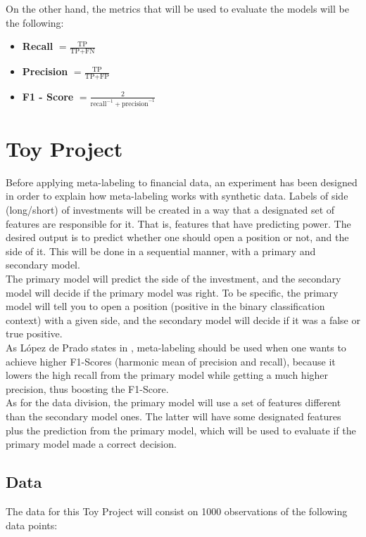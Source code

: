 \documentclass[a4paper]{report}
\begin{document}
On the other hand, the metrics that will be used to evaluate the 
models will be the following:
\begin{itemize}
	\item \textbf{Recall} $ = \frac{\text{TP}}{\text{TP} + \text{FN}}$
	
	\item \textbf{Precision} 
	$ = \frac{\text{TP}}{\text{TP} + \text{FP}}$
	
	\item \textbf{F1 - Score} 
	$ = \frac{2}{\text{recall}^{-1} + \text{precision}^{-1}}$
\end{itemize}

\section{Toy Project}
\label{sec:toyProject}
Before applying meta-labeling to financial data, an experiment has been 
designed in order to explain how meta-labeling works with synthetic data. 
Labels of side (long/short) of investments will be created in a way that a 
designated set of features are responsible for it. That is, features that 
have predicting power. The desired output is to predict whether one should 
open a position or not, and the side of it. This will be done in a 
sequential manner, with a primary and secondary model.\\

The primary model will predict the side of the investment, and the secondary 
model will decide if the primary model was right. To be specific, the 
primary model will tell you to open a position (positive in the binary 
classification context) with a given side, and the secondary model will 
decide if it was a false or true positive.\\

As López de Prado states in \cite{AdvFML}, meta-labeling should be used when 
one wants to achieve higher F1-Scores (harmonic mean of precision and 
recall), because it lowers the high recall from the primary model while 
getting a much higher precision, thus boosting the F1-Score.\\

As for the data division, the primary model will use a set of features 
different than the secondary model ones. The latter will have some 
designated features plus the prediction from the primary model, which will be 
used to evaluate if the primary model made a correct decision.

\subsection{Data}
The data for this Toy Project will consist on 1000 observations of the 
following data points:
\end{document}
